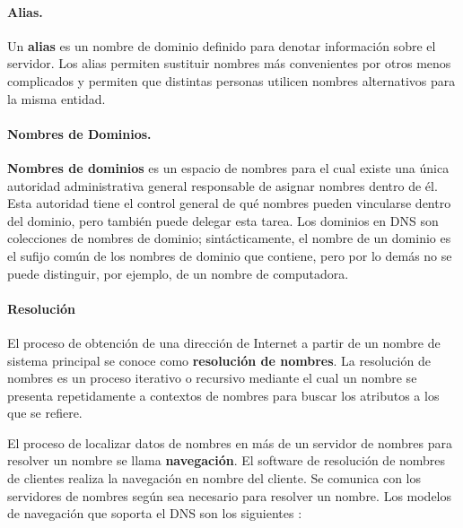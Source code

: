 \paragraph{Alias.}
Un \textbf{alias} es un nombre de dominio definido para denotar información sobre el servidor. Los alias permiten sustituir nombres más convenientes por otros menos complicados y permiten que distintas personas utilicen nombres alternativos para la misma entidad.

\paragraph{Nombres de Dominios.}\textbf{Nombres de dominios} es un espacio de nombres para el cual existe una única autoridad administrativa general responsable de asignar nombres dentro de él. Esta autoridad tiene el control general de qué nombres pueden vincularse dentro del dominio, pero también puede delegar esta tarea. Los dominios en DNS son colecciones de nombres de dominio; sintácticamente, el nombre de un dominio es el sufijo común de los nombres de dominio que contiene, pero por lo demás no se puede distinguir, por ejemplo, de un nombre de computadora.
 

\paragraph{Resolución} 
El proceso de obtención de una dirección de Internet a partir de un nombre de sistema principal se conoce como \textbf{resolución de nombres}.  La resolución de nombres es un proceso iterativo o recursivo mediante el cual un nombre se presenta repetidamente a contextos de nombres para buscar los atributos a los que se refiere. 

El proceso de localizar datos de nombres en más de un servidor de nombres para resolver un nombre se llama \textbf{navegación}. El software de resolución de nombres de clientes realiza la navegación en nombre del cliente. Se comunica con los servidores de nombres según sea necesario para resolver un nombre.  
Los modelos de navegación que soporta el DNS son los siguientes \cite{Coulouris2011}:

